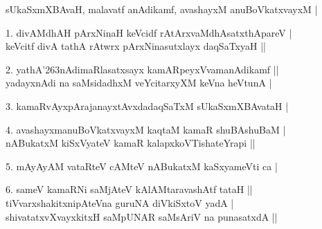 \begin{entry}
\begin{shl}
sUkaSxmXBAvaH, malavatf anAdikamf, avashayxM anuBoVkatxvayxM |
\end{shl}
\medskip
\begin{shl}
1. divAMdhAH pArxNinaH keVcidf rAtArxvaMdhAsatxthApareV |\\[1pt]
\hspace{0.3cm} keVcitf divA tathA rAtwrx pArxNinasutxlayx daqSaTxyaH ||
\end{shl}
\medskip
{}
\medskip
\begin{shl}
2. yathA\char'263nAdimaRlasatxsayx kamARpeyxVvamanAdikamf ||\\[1pt]
\hspace{0.3cm} yadayxnAdi na saMsidadhxM veYcitarxyXM keVna heVtunA |
\end{shl}
\medskip
{}
\medskip
\begin{shl}
3. kamaRvAyxpArajanayxtAvxdadaqSaTxM sUkaSxmXBAvataH |
\end{shl}
\medskip
{}
\medskip
\begin{shl}
4. avashayxmanuBoVkatxvayxM kaqtaM kamaR shuBAshuBaM |\\[1pt]
\hspace{0.3cm} nABukatxM kiSxVyateV kamaR kalapxkoVTishateYrapi ||
\end{shl}
\medskip
{}
\medskip
\begin{shl}
5. mAyAyAM vataRteV cAMteV nABukatxM kaSxyameVti ca |
\end{shl}
\medskip
{}
\medskip
\begin{shl}
6. sameV kamaRNi saMjAteV kAlAMtaravashAtf tataH ||\\[1pt]
\hspace{0.3cm} tiVvarxshakitxnipAteVna guruNA diVkiSxtoV yadA |\\[1pt]
\hspace{0.3cm} shivatatxvXvayxkitxH saMpUNAR saMsAriV na punasatxdA ||
\end{shl}
\medskip
{}

\end{entry}
